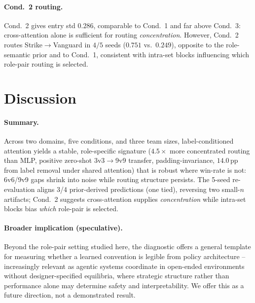 \documentclass{nextgame2026}
\begin{document}
\paragraph{Cond.~2 routing.} Cond.~2 gives entry std $0.286$, comparable to Cond.~1 and far above Cond.~3: cross-attention alone is sufficient for routing \emph{concentration}. However, Cond.~2 routes Strike$\to$Vanguard in $4/5$ seeds ($0.751$ vs.\ $0.249$), opposite to the role-semantic prior and to Cond.~1, consistent with intra-set blocks influencing which role-pair routing is selected.

\section{Discussion}
\label{sec:discussion}

\paragraph{Summary.} Across two domains, five conditions, and three team sizes, label-conditioned attention yields a stable, role-specific signature ($4.5\times$ more concentrated routing than MLP, positive zero-shot 3v3$\to$9v9 transfer, padding-invariance, $14.0$\,pp from label removal under shared attention) that is robust where win-rate is not: 6v6/9v9 gaps shrink into noise while routing structure persists. The 5-seed re-evaluation aligns 3/4 prior-derived predictions (one tied), reversing two small-$n$ artifacts; Cond.~2 suggests cross-attention supplies \emph{concentration} while intra-set blocks bias \emph{which} role-pair is selected.

\paragraph{Broader implication (speculative).} Beyond the role-pair setting studied here, the diagnostic offers a general template for measuring whether a learned convention is legible from policy architecture -- increasingly relevant as agentic systems coordinate in open-ended environments without designer-specified equilibria, where strategic structure rather than performance alone may determine safety and interpretability. We offer this as a future direction, not a demonstrated result.
\end{document}
